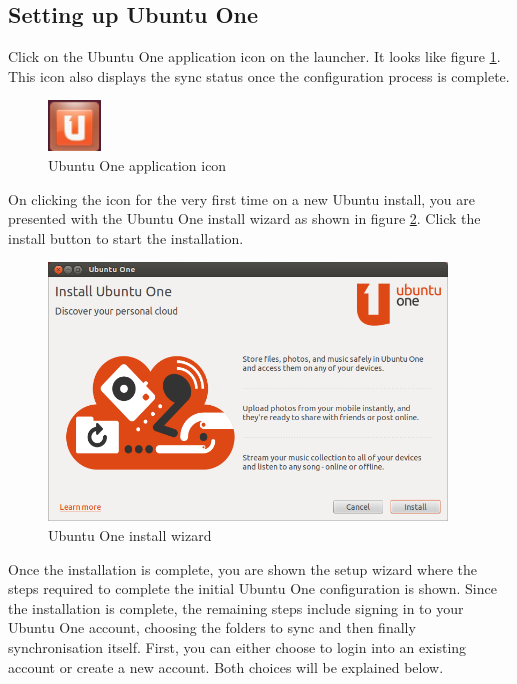 \subsection*{Setting up Ubuntu One}

\par \noindent Click on the Ubuntu One application icon on the launcher. It looks like figure \ref{fig:share1}. This icon also displays the sync status once the configuration process is complete.

\begin{figure}[h!]	
	\centering
	\includegraphics[width=40pt]{./images/basic-tasks/share1.png}
	\caption{Ubuntu One application icon}	
	\label{fig:share1}		
\end{figure}

\par \noindent On clicking the icon for the very first time on a new Ubuntu install, you are presented with the Ubuntu One install wizard as shown in figure \ref{fig:share2}. Click the install button to start the installation. 

\begin{figure}[h!]	
	\centering
	\includegraphics[width=300pt]{./images/basic-tasks/share2.png}
	\caption{Ubuntu One install wizard}	
	\label{fig:share2}		
\end{figure}

\par \noindent Once the installation is complete, you are shown the setup wizard where the steps required to complete the initial Ubuntu One configuration is shown. Since the installation is complete, the remaining steps include signing in to your Ubuntu One account, choosing the folders to sync and then finally synchronisation itself. First, you can either choose to login into an existing account or create a new account. Both choices will be explained below. \\


